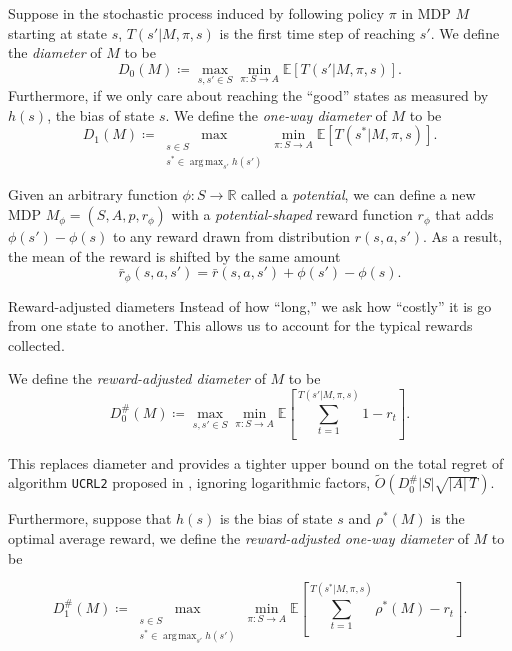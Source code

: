 \documentclass[final]{beamer}
\DeclareMathOperator*{\argmax}{arg\,max}
\newcommand{\Exp}{\mathbb{E}}
\newlength{\colwidth}
\begin{document}
\begin{frame}[t]
\begin{columns}[t]
\begin{column}{\colwidth}
  Suppose in the stochastic process induced by following policy $\pi$ in MDP $M$ starting at state $s$, $T(s'|M, \pi, s)$ is the first time step of reaching $s'$. We define the \emph{diameter} of $M$ \cite{jaksch2010near} to be
  $$ D_0(M) \coloneqq \max_{s, s' \in S} \min_{\pi: S \rightarrow A} \Exp \left[ T(s'|M, \pi, s) \right]. $$
  Furthermore, if we only care about reaching the ``good'' states as measured by $h(s)$, the bias of state $s$. We define the \emph{one-way diameter} of $M$ \cite{bartlett2009regal} to be
  $$ D_1(M) \coloneqq \max_{\substack{s \in S \\ s^* \in \argmax_{s'} h(s')}} \min_{\pi: S \rightarrow A} \Exp \left[ T(s^*|M, \pi, s) \right]. $$
  
  Given an arbitrary function $\phi: S \rightarrow \mathbb{R}$ called a \textit{potential}, we can define a new MDP $M_\phi = (S, A, p, r_\phi)$ with a \textit{potential-shaped} reward function $r_\phi$ that adds $\phi(s') - \phi(s)$ to any reward drawn from distribution $r(s, a, s')$. As a result, the mean of the reward is shifted by the same amount
  \begin{equation*}
    \bar{r}_\phi(s, a, s') = \bar{r}(s, a, s') + \phi(s') - \phi(s).
  \end{equation*}

  \begin{block}{Reward-adjusted diameters}
    Instead of how ``long,'' we ask how ``costly'' it is go from one state to another. This allows us to account for the typical rewards collected.
    
    We define the \emph{reward-adjusted diameter} of $M$ to be
    $$ D_0^\#(M) \coloneqq \max_{s, s' \in S} \min_{\pi: S \rightarrow A} \Exp \left[ \sum_{t=1}^{T(s'|M, \pi, s)} 1 - r_t \right]. $$

    This replaces diameter and provides a tighter upper bound on the total regret of algorithm \texttt{UCRL2} proposed in \cite{jaksch2010near}, ignoring logarithmic factors, $\tilde{O}(D_0^\#|S|\sqrt{|A|\,T})$. 

  \end{block}

  Furthermore, suppose that $h(s)$ is the bias of state $s$ and $\rho^*(M)$ is the optimal average reward, we define the \emph{reward-adjusted one-way diameter} of $M$ to be

  $$ D_1^\#(M) \coloneqq \max_{\substack{s \in S \\ s^* \in \argmax_{s'} h(s')}} \min_{\pi: S \rightarrow A} \Exp \left[ \sum_{t=1}^{T(s^*|M, \pi, s)} \rho^*(M) - r_t \right]. $$
  

\end{column}
\end{columns}
\end{frame}
\end{document}
